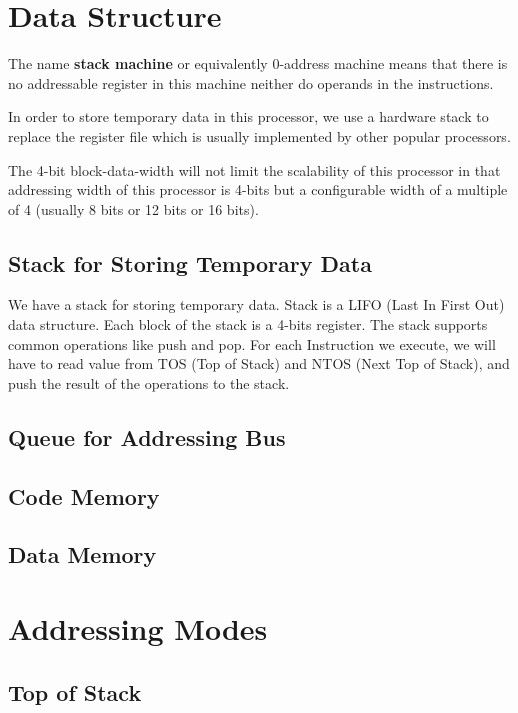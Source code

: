 \documentclass[11pt]{report}
\begin{document}
    \section{Data Structure}
    The name \textbf{stack machine} or equivalently 0-address machine means that 
    there is no addressable register in this machine neither do operands in the instructions. \par
    
    In order to store temporary data in this processor, we use a hardware stack to replace 
    the register file which is usually implemented by other popular processors. \par

    The 4-bit block-data-width will not limit the scalability of this processor in that addressing
    width of this processor is 4-bits but a configurable width of a multiple of 4 
    (usually 8 bits or 12 bits or 16 bits).

    \subsection{Stack for Storing Temporary Data}
    We have a stack for storing temporary data. 
    Stack is a LIFO (Last In First Out) data structure.
    Each block of the stack is a 4-bits register.
    The stack supports common operations like push and pop. For each Instruction we execute,
    we will have to read value from TOS (Top of Stack) and NTOS (Next Top of Stack), 
    and push the result of the operations to the stack.

    \subsection{Queue for Addressing Bus}
    \subsection{Code Memory}
    \subsection{Data Memory}

    \section{Addressing Modes}
    \subsection{Top of Stack}
\end{document}
